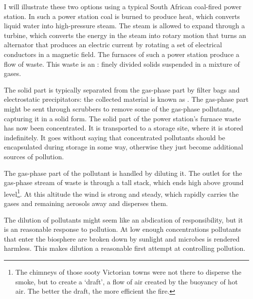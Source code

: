 
I will illu\-strate these two options using a typical South Afri\-can coal-fired
pow\-er sta\-tion. In such a power station coal is burned to produce heat, which
converts liquid water into high-pressure steam. The steam is allowed to expand
through a turbine, which converts the energy in the steam into rotary motion
that turns an alternator that produces an electric current by rotating a set of
electrical conductors in a magnetic field. The furnaces of such a power station
produce a flow of waste. This waste is an :
finely divided solids suspended in a mixture of gases.

The solid part is typically separated from the gas-phase part by filter bags and
electrostatic precipitators: the collected material is known as . The gas-phase part might be sent through scrubbers to remove some of the
gas-phase pollutants, capturing it in a solid form. The solid part of the power
station's furnace waste has now been concentrated. It is transported to a
storage site, where it is stored indefinitely. It goes without saying that
concentrated pollutants should be encapsulated during storage in some way,
otherwise they just become additional sources of pollution.

The gas-phase part of the pollutant is handled by diluting it. The outlet for
the gas-phase stream of waste is through a tall stack, which ends high above
ground level\footnote{The chimneys of those sooty Victorian towns were not there
to disperse the smoke, but to create a `draft', a flow of air created by the
buoyancy of hot air. The better the draft, the more efficient the fire.}. At
this altitude the wind is strong and steady, which rapidly carries the gases and
remaining aerosols away and disperses them.

The dilution of pollutants might seem like an abdication of responsibility, but
it is an reasonable response to pollution. At low enough concentrations
pollutants that enter the biosphere are broken down by sunlight and microbes
is rendered harmless. This makes dilution a reasonable first attempt at
controlling pollution.

